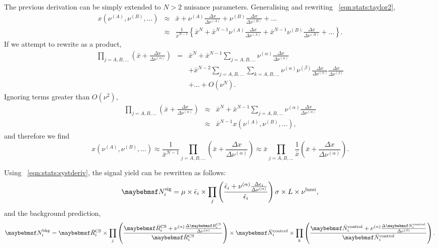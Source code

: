 The previous derivation can be simply extended to $N > 2$ nuisance
parameters. Generalising and rewriting \eqn~\ref{eqn:stats:taylor2},
\begin{eqnarray*}
x(\nu^{(A)}, \nu^{(B)}, \ldots) &\approx& \bar{x} +
\nu^{(A)}\frac{\Delta x}{\Delta\nu^{(A)}} +
\nu^{(B)}\frac{\Delta x}{\Delta\nu^{(B)}} + \ldots \\
&\approx& \frac{1}{\bar{x}^{N-1}} \left\{ \bar{x}^N +
\bar{x}^{N-1} \nu^{(A)}\frac{\Delta x}{\Delta\nu^{(A)}} +
\bar{x}^{N-1} \nu^{(B)}\frac{\Delta x}{\Delta\nu^{(B)}} + \ldots \right\}.
\end{eqnarray*}
If we attempt to rewrite as a product,
\begin{eqnarray*}
\prod_{j=A, B, \ldots} \left(\bar{x} + \frac{\Delta x}{\Delta\nu^{(\alpha)}}\right) &=&
\bar{x}^N + \bar{x}^{N-1} \sum_{j=A, B, \ldots} \nu^{(\alpha)}\frac{\Delta x}{\Delta \nu^{(\alpha)}} \\
&&+ \bar{x}^{N-2}\sum_{j=A, B, \ldots} \sum_{k=A, B, \ldots} \nu^{(\alpha)}\nu^{(\beta)}\frac{\Delta x}{\Delta
  \nu^{(\alpha)}}\frac{\Delta x}{\Delta \nu^{(\beta)}} \\
&&+ \ldots +O(\nu^N).
\end{eqnarray*}
Ignoring terms greater than $O(\nu^2)$,
\begin{eqnarray*}
\prod_{j=A, B, \ldots} \left(\bar{x} + \frac{\Delta x}{\Delta\nu^{(\alpha)}}\right) &\approx&
\bar{x}^N + \bar{x}^{N-1} \sum_{j=A, B, \ldots} \nu^{(\alpha)}\frac{\Delta x}{\Delta
  \nu^{(\alpha)}} \\
&\approx& \bar{x}^{N-1} x(\nu^{(A)}, \nu^{(B)}, \ldots),
\end{eqnarray*}
and therefore we find
\begin{equation}
\label{eqn:stats:systderiv}
x(\nu^{(A)}, \nu^{(B)}, \ldots) \approx \frac{1}{\bar{x}^{N-1}} \prod_{j = A, B,
  \ldots} \left(\bar{x} + \frac{\Delta x}{\Delta\nu^{(\alpha)}}\right) \approx
\bar{x} \prod_{j = A, B,
  \ldots} \frac{1}{\bar{x}}\left(\bar{x} + \frac{\Delta x}{\Delta\nu^{(\alpha)}}\right).
\end{equation}

Using \eqn~\ref{eqn:stats:systderiv}, the signal yield can be rewritten as follows:
\begin{equation*}
\NSigi = \mu \times \bar{\epsilon}_i \times \prod_{j}\left(\frac{\bar{\epsilon}_i
    + \nu^{(\alpha)}\frac{\Delta\epsilon_i}{\Delta\nu^{(\alpha)}}}{\bar{\epsilon}_i}\right) \sigma \times L \times \nu^{\textrm{lumi}},
\end{equation*}
and the background prediction,
\begin{equation*}
\NBkgi = \RbarCS_i \times \prod_{j}\left( \frac{\RbarCS_i
    + \nu^{(\alpha)}\frac{\Delta\RCSi}{\Delta\nu^{(\alpha)}}}{\RbarCS_i}\right)
\times \NbarControl_i \times \prod_{k}\left( \frac{\NbarControl_i
    + \nu^{(\alpha)}\frac{\Delta\NControli}{\Delta\nu^{(\beta)}}}{\NbarControl_i}\right).
\end{equation*}

